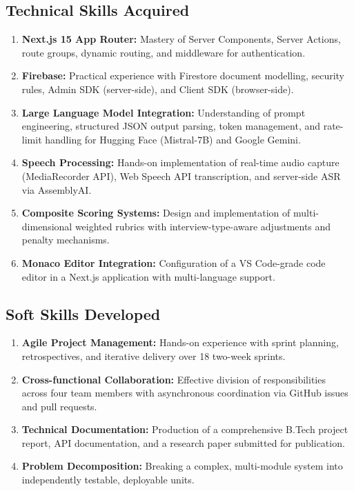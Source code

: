 \documentclass[12pt,a4paper,oneside]{report}
\begin{document}
\subsection{Technical Skills Acquired}
\begin{enumerate}
  \item \textbf{Next.js 15 App Router:} Mastery of Server Components, Server Actions, route groups, dynamic routing, and middleware for authentication.
  \item \textbf{Firebase:} Practical experience with Firestore document modelling, security rules, Admin SDK (server-side), and Client SDK (browser-side).
  \item \textbf{Large Language Model Integration:} Understanding of prompt engineering, structured JSON output parsing, token management, and rate-limit handling for Hugging Face (Mistral-7B) and Google Gemini.
  \item \textbf{Speech Processing:} Hands-on implementation of real-time audio capture (MediaRecorder API), Web Speech API transcription, and server-side ASR via AssemblyAI.
  \item \textbf{Composite Scoring Systems:} Design and implementation of multi-dimensional weighted rubrics with interview-type-aware adjustments and penalty mechanisms.
  \item \textbf{Monaco Editor Integration:} Configuration of a VS Code-grade code editor in a Next.js application with multi-language support.
\end{enumerate}

\subsection{Soft Skills Developed}
\begin{enumerate}
  \item \textbf{Agile Project Management:} Hands-on experience with sprint planning, retrospectives, and iterative delivery over 18 two-week sprints.
  \item \textbf{Cross-functional Collaboration:} Effective division of responsibilities across four team members with asynchronous coordination via GitHub issues and pull requests.
  \item \textbf{Technical Documentation:} Production of a comprehensive B.Tech project report, API documentation, and a research paper submitted for publication.
  \item \textbf{Problem Decomposition:} Breaking a complex, multi-module system into independently testable, deployable units.
\end{enumerate}
\end{document}
